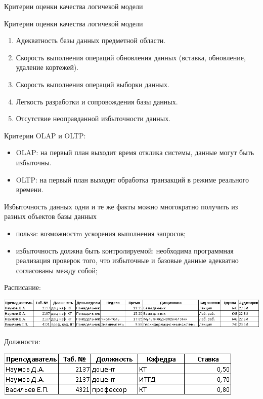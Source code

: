 \documentclass{beamer}
\begin{document}
\begin{frame}{Критерии оценки качества логичекой модели}
\begin{block}{Критерии оценки качества логичекой модели}
\begin{enumerate}
\item Адекватность базы данных предметной области.
\item Скорость выполнения операций обновления данных (вставка, обновление, удаление кортежей).
\item Скорость выполнения операций выборки данных.
\item Легкость разработки и сопровождения базы данных.
\item Отсутствие неоправданной избыточности данных.
\end{enumerate}
\end{block}
Критерии OLAP и OLTP:
\begin{itemize}
\item OLAP: на первый план выходит время отклика системы, данные могут быть избыточны.
\item OLTP: на первый план выходит обработка транзакций в режиме реального времени.
\end{itemize}
\end{frame}

\begin{frame}
\begin{block}{Избыточность данных}
одни и те же факты можно многократно получить из разных объектов базы данных
\end{block}
\begin{itemize}
\item польза: возможностm ускорения выполнения запросов;
\item избыточность должна быть контролируемой: необходима программная реализация проверок того, что избыточные и базовые данные адекватно согласованы между собой;
\end{itemize}
Расписание:
\begin{center}
\includegraphics[scale=0.45]{images/ex-rasp-01.png}
\end{center}
Должности:
\begin{center}
\includegraphics[scale=0.45]{images/ex-rasp-02.png}
\end{center}
\end{frame}
\end{document}
